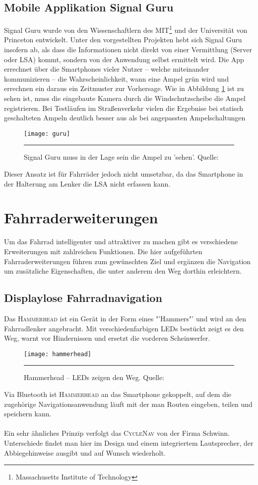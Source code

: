 \subsection*{Mobile Applikation Signal Guru}
Signal Guru wurde von den Wissenschaftlern des MIT\footnote{ Massachusetts Institute of Technology} und der Universität von Princeton entwickelt. Unter den vorgestellten Projekten hebt sich Signal Guru insofern ab, als dass die Informationen nicht direkt von einer Vermittlung (Server oder \gls{LSA}) kommt, sondern von der Anwendung selbst ermittelt wird. Die \Gls{App} errechnet über die \glspl{Smartphone} vieler Nutzer -- welche miteinander kommunizieren -- die Wahrscheinlichkeit, wann eine Ampel grün wird und errechnen ein daraus ein Zeitmuster zur Vorhersage. Wie in Abbildung \ref{fig:AppSignalGuru} ist zu sehen ist, muss die eingebaute Kamera durch die Windschutzscheibe die Ampel registrieren. Bei Testläufen im Straßenverkehr vielen die Ergebnise bei statisch geschalteten Ampeln deutlich besser aus als bei angepassten Ampelschaltungen \cite{SignalGuruPaper} 
\begin{figure}[H]
    \centering
    \texttt{[image: guru]}
    \rule{35em}{0.5pt}
    \caption[Signal Guru]{Signal Guru muss in der Lage sein die Ampel zu 'sehen'.  Quelle: \cite{SignalGuruPaper}} \label{fig:AppSignalGuru}
\end{figure}
Dieser Ansatz ist für Fahrräder jedoch nicht umsetzbar, da das \gls{Smartphone} in der Halterung am Lenker die \gls{LSA} nicht erfassen kann.
%
%
\section{Fahrraderweiterungen}
Um das Fahrrad intelligenter und attraktiver zu machen gibt es verschiedene Erweiterungen mit zahlreichen Funktionen. Die hier aufgeführten Fahrraderweiterungen führen zum gewünschten Ziel und ergänzen die Navigation um zusätzliche Eigenschaften, die unter anderem den Weg dorthin erleichtern.
\subsection{Displaylose Fahrradnavigation}
Das \textsc{Hammerhead} ist ein Gerät in der Form eines "'Hammers"' und wird an den Fahrradlenker angebracht. Mit verschiedenfarbigen \glspl{LED} bestückt zeigt es den Weg, warnt vor Hindernissen und ersetzt die vorderen Scheinwerfer.
\begin{figure}[H]
    \centering
    \texttt{[image: hammerhead]}
    \rule{35em}{0.5pt}
    \caption[Hammerhead]{Hammerhead -- \glspl{LED} zeigen den Weg.  Quelle: \cite{Hammerhead}} 
    \label{fig:hammerhead}
\end{figure}
Via Bluetooth ist \textsc{Hammerhead} an das \gls{Smartphone} gekoppelt, auf dem die zugehörige Navigationsanwendung läuft mit der man Routen eingeben, teilen und speichern kann\cite{Hammerhead}.\\\\
Ein sehr ähnliches Prinzip verfolgt das \textsc{CycleNav} von der Firma Schwinn. Unterschiede findet man hier im Design und einem integriertem Lautsprecher, der Abbiegehinweise ausgibt und auf Wunsch wiederholt\cite{CycleNav}.
